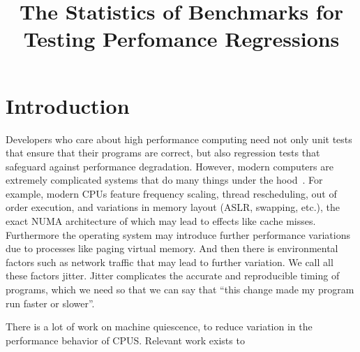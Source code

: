\documentclass[conference]{IEEEtran}
\begin{document}
\newcommand{\TODO}[1]{\todo[inline]{#1}}
\newcommand{\TODOFIG}[1]{\missingfigure{#1}}

\title{The Statistics of Benchmarks for Testing Perfomance Regressions}

\author{
}

\maketitle

\begin{abstract}
\TODO{The abstract goes here.}
\end{abstract}

\IEEEpeerreviewmaketitle

\section{Introduction}

Developers who care about high performance computing need not only unit tests that
ensure that their programs are correct, but also regression tests that safeguard
against performance degradation. However, modern computers are extremely complicated
systems that do many things under the hood~\cite{HP5e}.
For example, modern CPUs feature frequency scaling, thread rescheduling,
out of order execution,
and variations in memory layout (ASLR, swapping, etc.), the exact NUMA architecture
of which may lead to effects like cache misses.
Furthermore the operating system may introduce further performance variations
due to processes like paging virtual memory.
And then there is environmental factors such as network traffic that may lead to
further variation. We call all these factors jitter.
Jitter complicates the accurate and reproducible timing of programs, which we
need so that we can say that ``this change made my program run faster or slower''.

There is a lot of work on machine quiescence, to reduce variation in the performance
behavior of CPUS. Relevant work exists to
\end{document}
